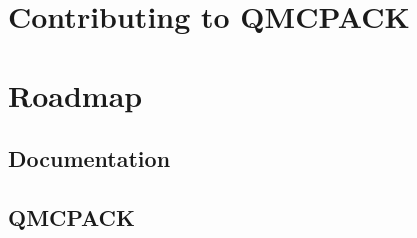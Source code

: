 \section{Contributing to QMCPACK}
\label{sec:contributing}

\section{Roadmap}
\label{sec:roadmap}

\subsection{Documentation}

\subsection{QMCPACK}
